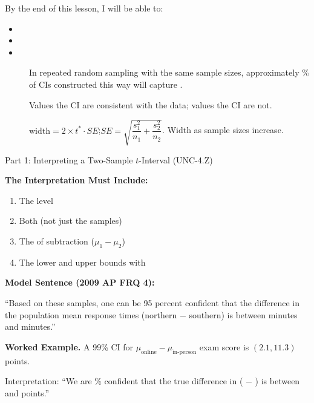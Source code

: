 \documentclass[10pt]{article}
\begin{document}
\namedateperiod

\vspace{0.15in}

\begin{objectivebox}
By the end of this lesson, I will be able to:
\begin{itemize}
  \item \writeline
  \item \writeline
  \item \writeline
\end{itemize}
\end{objectivebox}

\begin{vocabbox}
\begin{description}
  \item[]
        In repeated random sampling with the same sample sizes, approximately \blank{2cm}\%
        of CIs constructed this way will capture \blank{5cm}.
  \item[]
        Values \blank{3cm} the CI are consistent with the data; values \blank{3cm} the
        CI are not.
  \item[]
        $\text{width} = 2 \times t^* \cdot SE$;\quad $SE = \sqrt{\dfrac{s_1^2}{n_1} + \dfrac{s_2^2}{n_2}}$.
        Width \blank{3cm} as sample sizes increase.
\end{description}
\end{vocabbox}

\begin{notesbox}{Part 1: Interpreting a Two-Sample $t$-Interval (UNC-4.Z)}

\textbf{The Interpretation Must Include:}
\begin{enumerate}
  \item The \blank{3cm} level
  \item Both \blank{3cm} (not just the samples)
  \item The \blank{4cm} of subtraction ($\mu_1 - \mu_2$)
  \item The lower and upper bounds with \blank{2cm}
\end{enumerate}

\medskip
\textbf{Model Sentence (2009 AP FRQ 4):}

``Based on these samples, one can be 95 percent confident that the difference in the
population mean response times (northern $-$ southern) is between \blank{2cm} minutes
and \blank{2cm} minutes.''

\medskip
\textbf{Worked Example.} A 99\% CI for $\mu_{\text{online}} - \mu_{\text{in-person}}$ exam
score is $(2.1, 11.3)$ points.

\medskip
Interpretation: ``We are \blank{2cm}\% confident that the true difference in \blank{5cm}
(\blank{2cm} $-$ \blank{2cm}) is between \blank{1.5cm} and \blank{1.5cm} points.''

\end{notesbox}
\end{document}
